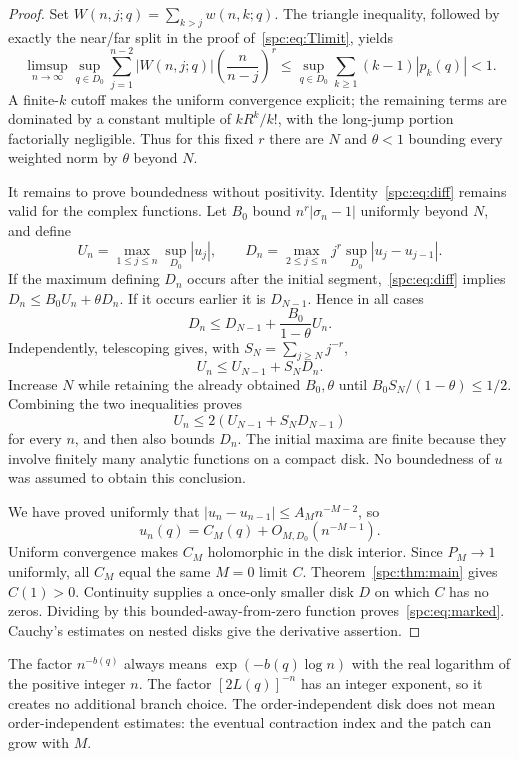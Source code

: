 \documentclass[11pt,letterpaper]{article}
\theoremstyle{definition}\newtheorem{definition}[theorem]{Definition}
\theoremstyle{remark}\newtheorem{remark}[theorem]{Remark}
\begin{document}
\begin{proof}
Set $W(n,j;q)=\sum_{k>j}w(n,k;q)$. The triangle inequality, followed by exactly the near/far split in the proof of~\eqref{spc:eq:Tlimit}, yields
\begin{equation}\label{spc:eq:complexnorm}
 \limsup_{n\to\infty}\sup_{q\in D_0}
 \sum_{j=1}^{n-2}|W(n,j;q)|\left(\frac n{n-j}\right)^r
 \le\sup_{q\in D_0}\sum_{k\ge1}(k-1)|p_k(q)|<1.
\end{equation}
A finite-$k$ cutoff makes the uniform convergence explicit; the remaining terms are dominated by a constant multiple of $kR^k/k!$, with the long-jump portion factorially negligible. Thus for this fixed $r$ there are $N$ and $\theta<1$ bounding every weighted norm by $\theta$ beyond $N$.

It remains to prove boundedness without positivity. Identity~\eqref{spc:eq:diff} remains valid for the complex functions. Let $B_0$ bound $n^r|\sigma_n-1|$ uniformly beyond $N$, and define
\[
 U_n=\max_{1\le j\le n}\sup_{D_0}|u_j|,\qquad
 D_n=\max_{2\le j\le n}j^r\sup_{D_0}|u_j-u_{j-1}|.
\]
If the maximum defining $D_n$ occurs after the initial segment,~\eqref{spc:eq:diff} implies $D_n\le B_0U_n+\theta D_n$. If it occurs earlier it is $D_{N-1}$. Hence in all cases
\begin{equation}\label{spc:eq:bootstrap1}
 D_n\le D_{N-1}+\frac{B_0}{1-\theta}U_n.
\end{equation}
Independently, telescoping gives, with $S_N=\sum_{j\ge N}j^{-r}$,
\begin{equation}\label{spc:eq:bootstrap2}
 U_n\le U_{N-1}+S_ND_n.
\end{equation}
Increase $N$ while retaining the already obtained $B_0,\theta$ until $B_0S_N/(1-\theta)\le1/2$. Combining the two inequalities proves
\[
 U_n\le2(U_{N-1}+S_ND_{N-1})
\]
for every $n$, and then also bounds $D_n$. The initial maxima are finite because they involve finitely many analytic functions on a compact disk. No boundedness of $u$ was assumed to obtain this conclusion.

We have proved uniformly that $|u_n-u_{n-1}|\le A_Mn^{-M-2}$, so
\[
 u_n(q)=C_M(q)+O_{M,D_0}(n^{-M-1}).
\]
Uniform convergence makes $C_M$ holomorphic in the disk interior. Since $P_M\to1$ uniformly, all $C_M$ equal the same $M=0$ limit $C$. Theorem~\ref{spc:thm:main} gives $C(1)>0$. Continuity supplies a once-only smaller disk $D$ on which $C$ has no zeros. Dividing by this bounded-away-from-zero function proves~\eqref{spc:eq:marked}. Cauchy's estimates on nested disks give the derivative assertion.
\end{proof}
The factor $n^{-b(q)}$ always means $\exp(-b(q)\log n)$ with the real logarithm of the positive integer $n$. The factor $[2L(q)]^{-n}$ has an integer exponent, so it creates no additional branch choice. The order-independent disk does not mean order-independent estimates: the eventual contraction index and the patch can grow with $M$.
\end{document}
